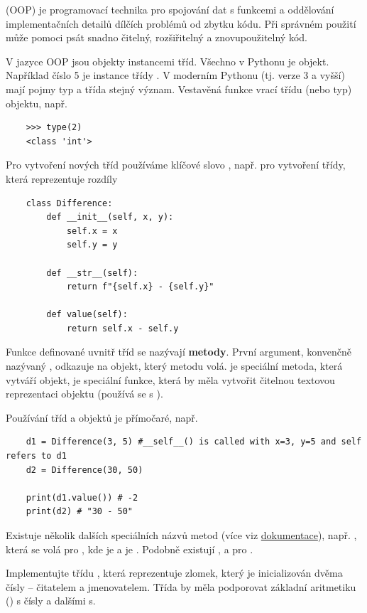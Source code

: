\begin{syntax}
    (OOP) je programovací technika pro spojování dat s funkcemi a oddělování implementačních detailů dílčích problémů od zbytku kódu. Při správném použití může pomoci psát snadno čitelný, rozšiřitelný a znovupoužitelný kód.

    V jazyce OOP jsou objekty instancemi tříd. Všechno v Pythonu je objekt. Například číslo 5 je instance třídy . V moderním Pythonu (tj. verze 3 a vyšší) mají pojmy typ a třída stejný význam. Vestavěná funkce  vrací třídu (nebo typ) objektu, např.
\begin{lstlisting}
    >>> type(2)
    <class 'int'>
\end{lstlisting}

    Pro vytvoření nových tříd používáme klíčové slovo , např. pro vytvoření třídy, která reprezentuje rozdíly
\begin{lstlisting}
    class Difference:
        def __init__(self, x, y):
            self.x = x
            self.y = y
            
        def __str__(self):
            return f"{self.x} - {self.y}"
        
        def value(self):
            return self.x - self.y
\end{lstlisting}
    Funkce definované uvnitř tříd se nazývají \textbf{metody}. První argument, konvenčně nazývaný , odkazuje na objekt, který metodu volá.  je speciální metoda, která vytváří objekt,  je speciální funkce, která by měla vytvořit čitelnou textovou reprezentaci objektu (používá se s ).

    Používání tříd a objektů je přímočaré, např.
\begin{lstlisting}
    d1 = Difference(3, 5) #__self__() is called with x=3, y=5 and self refers to d1
    d2 = Difference(30, 50) 

    print(d1.value()) # -2
    print(d2) # "30 - 50"
\end{lstlisting}

    Existuje několik dalších speciálních názvů metod (více viz \href{https://docs.python.org/3/reference/datamodel.html#emulating-numeric-types}{dokumentace}), např. , která se volá pro , kde  je  a  je . Podobně existují ,  a  pro \ls{-, *, /}.

\begin{exercise}
    Implementujte třídu , která reprezentuje zlomek, který je inicializován dvěma čísly -- čitatelem a jmenovatelem. Třída by měla podporovat základní aritmetiku (\ls{+,-,*,/}) s čísly a dalšími s.
\end{exercise}

\end{syntax}